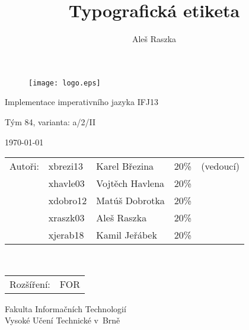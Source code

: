 \documentclass[12pt,a4paper]{article}
\title{Typografická etiketa}
\author{Aleš Raszka}
\date{}
\begin{document}
\begin{titlepage}

\begin{figure}[!h]
  \centering
  \texttt{[image: logo.eps]}
\end{figure}

\vfill

\begin{center}
\begin{Huge}
Implementace imperativního jazyka IFJ13\\
\end{Huge}
\bigskip
\begin{Large}
Tým 84, varianta: a/2/II
\end{Large}
\end{center}

\vfill

\begin{center}
\begin{Large}
\today
\end{Large}
\end{center}

\vfill

\begin{flushleft}
\begin{normalsize}
\begin{tabular}{lllll}
Autoři: & xbrezi13 & Karel Březina & 20\% &(vedoucí)\\
 & xhavle03 & Vojtěch Havlena & 20\% &\\
 & xdobro12 & Matúš Dobrotka & 20\% &\\
 & xraszk03 & Aleš Raszka & 20\% &\\
 & xjerab18 & Kamil Jeřábek & 20\% &\\
\end{tabular}\\
\vspace{0.5cm}
\begin{tabular}{ll}
Rozšíření: & FOR
\end{tabular}

\end{normalsize}
\begin{large}
\vspace{0.5cm}
Fakulta Informačních Technologií \\
Vysoké Učení Technické v~Brně \\
\end{large}
\end{flushleft}
\end{titlepage}
\end{document}
